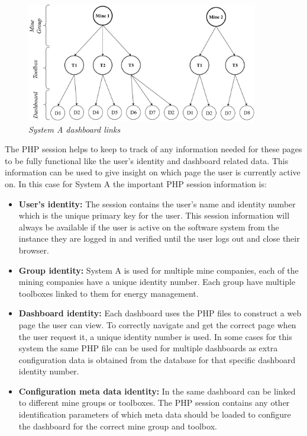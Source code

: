 \begin{figure}[!htb] %
	\centering %
	\includegraphics[width=0.9\textwidth]{Images/Chapter2/SystemA_Dashboard/SystemA_Dashboard.pdf}
	\caption[System A dashboard links]
	{\textit{System A dashboard links}}\label{fig:ch2_SystemA_Dashboard}
\end{figure}

The PHP session helps to keep to track of any information needed for these pages to be fully functional like the user's identity and dashboard related data. This information can be used to give insight on which page the user is currently active on. In this case for System A the important PHP session information is:

\begin{itemize}
	\item \textbf{User's identity:} The session contains the user's name and identity number which is the unique primary key for the user. This session information will always be available if the user is active on the software system from the instance they are logged in and verified until the user logs out and close their browser.
	\item \textbf{Group identity:} System A is used for multiple mine companies, each of the mining companies have a unique identity number. Each group have multiple toolboxes linked to them for energy management.
	\item \textbf{Dashboard identity:} Each dashboard uses the PHP files to construct a web page the user can view. To correctly navigate and get the correct page when the user request it, a unique identity number is used. In some cases for this system the same PHP file can be used for multiple dashboards as extra configuration data is obtained from the database for that specific dashboard identity number.
	\item \textbf{Configuration meta data identity:} In  the same dashboard can be linked to different mine groups or toolboxes. The PHP session contains any other identification parameters of which meta data should be loaded to configure the dashboard for the correct mine group and toolbox.
\end{itemize}

